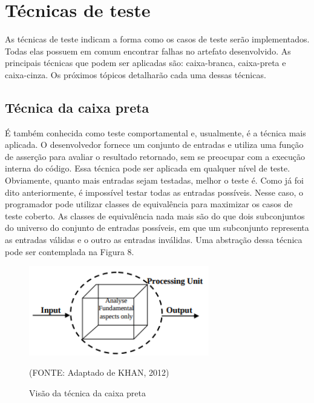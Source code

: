 \documentclass[
    12pt,       %
    openright,      %
    twoside,      %
    a4paper,      %
    english,      %
    french,       %
    spanish,      %
    brazil,       %
    ]{abntex2}
\begin{document}
      \section{Técnicas de teste}
          As técnicas de teste indicam a forma como os casos de teste serão implementados.
          Todas elas possuem em comum encontrar falhas no artefato desenvolvido. As principais
          técnicas que podem ser aplicadas são: caixa-branca, caixa-preta e caixa-cinza. Os próximos
          tópicos detalharão cada uma dessas técnicas.

          \subsection{Técnica da caixa preta}
              É também conhecida como teste comportamental e, usualmente, é a técnica mais aplicada.
              O desenvolvedor fornece um conjunto de entradas e utiliza uma função de asserção
              para avaliar o resultado retornado, sem se preocupar com a execução interna do código.
              Essa técnica pode ser aplicada em qualquer nível de teste. Obviamente, quanto mais
              entradas sejam testadas, melhor o teste é. Como já foi dito anteriormente, é
              impossível testar todas as entradas possíveis. Nesse caso, o programador pode utilizar
              classes de equivalência para maximizar os casos de teste coberto. As classes de equivalência
              nada mais são do que dois subconjuntos do universo do conjunto de entradas possíveis,
              em que um subconjunto representa as entradas válidas e o outro as entradas inválidas.
              Uma abstração dessa técnica pode ser contemplada na Figura 8.

              \begin{figure}[htbp]
                  \begin{center}
                      \includegraphics[width=0.7\textwidth]{img/blackbox.png}
                  \end{center}
              \caption{\label{fig:passaro}Visão da técnica da caixa preta}
              \begin{center}(FONTE: Adaptado de KHAN, 2012)\end{center}
              \end{figure}
\end{document}
